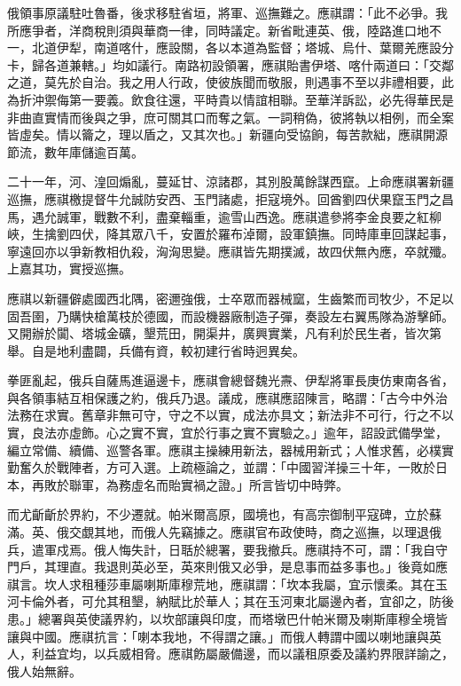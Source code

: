\begin{pinyinscope}
俄領事原議駐吐魯番，後求移駐省垣，將軍、巡撫難之。應祺謂：「此不必爭。我所應爭者，洋商稅則須與華商一律，同時議定。新省毗連英、俄，陸路進口地不一，北道伊犁，南道喀什，應設關，各以本道為監督；塔城、烏什、葉爾羌應設分卡，歸各道兼轄。」均如議行。南路初設領署，應祺貽書伊塔、喀什兩道曰：「交鄰之道，莫先於自治。我之用人行政，使彼族聞而敬服，則遇事不至以非禮相要，此為折沖禦侮第一要義。飲食往還，平時貴以情誼相聯。至華洋訴訟，必先得華民是非曲直實情而後與之爭，庶可關其口而奪之氣。一詞稍偽，彼將執以相例，而全案皆虛矣。情以籥之，理以盾之，又其次也。」新疆向受協餉，每苦款絀，應祺開源節流，數年庫儲逾百萬。

二十一年，河、湟回煽亂，蔓延甘、涼諸郡，其別股萬餘謀西竄。上命應祺署新疆巡撫，應祺檄提督牛允誠防安西、玉門諸處，拒寇境外。回酋劉四伏果竄玉門之昌馬，遇允誠軍，戰數不利，盡棄輜重，逾雪山西逸。應祺遣參將李金良要之紅柳峽，生擒劉四伏，降其眾八千，安置於羅布淖爾，設軍鎮撫。同時庫車回謀起事，寧遠回亦以爭新教相仇殺，洶洶思變。應祺皆先期撲滅，故四伏無內應，卒就殲。上嘉其功，實授巡撫。

應祺以新疆僻處國西北隅，密邇強俄，士卒眾而器械窳，生齒繁而司牧少，不足以固吾圉，乃購快槍萬枝於德國，而設機器廠制造子彈，奏設左右翼馬隊為游擊師。又開辦於闐、塔城金礦，墾荒田，開渠井，廣興實業，凡有利於民生者，皆次第舉。自是地利盡闢，兵備有資，較初建行省時迥異矣。

拳匪亂起，俄兵自薩馬進逼邊卡，應祺會總督魏光燾、伊犁將軍長庚仿東南各省，與各領事結互相保護之約，俄兵乃退。議成，應祺應詔陳言，略謂：「古今中外治法務在求實。舊章非無可守，守之不以實，成法亦具文；新法非不可行，行之不以實，良法亦虛飾。心之實不實，宜於行事之實不實驗之。」逾年，詔設武備學堂，編立常備、續備、巡警各軍。應祺主操練用新法，器械用新式；人惟求舊，必樸實勤奮久於戰陣者，方可入選。上疏極論之，並謂：「中國習洋操三十年，一敗於日本，再敗於聯軍，為務虛名而貽實禍之證。」所言皆切中時弊。

而尤齗齗於界約，不少遷就。帕米爾高原，國境也，有高宗御制平寇碑，立於蘇滿。英、俄交覷其地，而俄人先竊據之。應祺官布政使時，商之巡撫，以理退俄兵，遣軍戍焉。俄人悔失計，日聒於總署，要我撤兵。應祺持不可，謂：「我自守門戶，其理直。我退則英必至，英來則俄又必爭，是息事而益多事也。」後竟如應祺言。坎人求租種莎車屬喇斯庫穆荒地，應祺謂：「坎本我屬，宜示懷柔。其在玉河卡倫外者，可允其租墾，納賦比於華人；其在玉河東北屬邊內者，宜卻之，防後患。」總署與英使議界約，以坎部讓與印度，而塔墩巴什帕米爾及喇斯庫穆全境皆讓與中國。應祺抗言：「喇本我地，不得謂之讓。」而俄人轉謂中國以喇地讓與英人，利益宜均，以兵威相脅。應祺飭屬嚴備邊，而以議租原委及議約界限詳諭之，俄人始無辭。


\end{pinyinscope}
